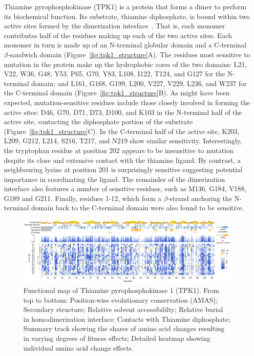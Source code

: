 Thiamine pyrophosphokinase (TPK1) is a protein that forms a dimer to perform its biochemical function. Its substrate, thiamine diphosphate, is bound within two active sites formed by the dimerization interface~\cite{timm_crystal_2001}. That is, each monomer contributes half of the residues making up each of the two active sites.  Each monomer in turn is made up of an N-terminal globular domain and a C-terminal $\beta$-sandwich domain (Figure~\ref{fig:tpk1_structure}A). The residues most sensitive to mutation in the protein make up the hydrophobic cores of the two domains: L21, V22, W36, G48, Y53, P65, G70, Y83, L108, I122, T124, and G127 for the N-terminal domain; and L161, G168, G199, L200, V227, V229, L236, and W237 for the C-terminal domain (Figure~\ref{fig:tpk1_structure}B). As might have been expected, mutation-sensitive residues include those closely involved in forming the active sites: D46, G70, D71, D73, D100, and K103 in the N-terminal half of the active site, contacting the diphosphate portion of the substrate (Figure~\ref{fig:tpk1_structure}C). In the C-terminal half of the active site, K203, L209, G212, L214, S216, T217, and N219 show similar sensitivity. Interestingly, the tryptophan residue at position 202 appears to be insensitive to mutation despite its close and extensive contact with the thiamine ligand. By contrast, a neighbouring lysine at position 201 is surprisingly sensitive suggesting potential importance in coordinating the ligand.  The remainder of the dimerization interface also features a number of sensitive residues, such as M136, G184, V188, G189 and G211. Finally, residues 1-12, which form a $\beta$-strand anchoring the N-terminal domain back to the C-terminal domain were also found to be sensitive.

\begin{landscape}
\begin{figure}[h!]
	\centering
	\includegraphics[width=9in]{img/tpk1-map.pdf}
	\caption{Functional map of Thiamine pyrophosphokinase 1 (TPK1). From top to bottom: Position-wise evolutionary conservation (AMAS); Secondary structure; Relative solvent accessibililty; Relative burial in homodimerization interface; Contacts with Thiamine diphosphate; Summary track showing the shares of amino acid changes resulting in varying degrees of fitness effects; Detailed heatmap showing individual amino acid change effects.}
	\label{fig:tpk1-map}
\end{figure}
\end{landscape}

